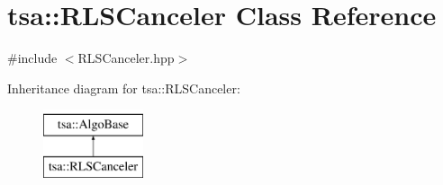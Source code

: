 \hypertarget{classtsa_1_1_r_l_s_canceler}{}\section{tsa\+:\+:R\+L\+S\+Canceler Class Reference}
\label{classtsa_1_1_r_l_s_canceler}


{\ttfamily \#include $<$R\+L\+S\+Canceler.\+hpp$>$}

Inheritance diagram for tsa\+:\+:R\+L\+S\+Canceler\+:\begin{figure}[H]
\begin{center}
\leavevmode
\includegraphics[height=2.000000cm]{classtsa_1_1_r_l_s_canceler}
\end{center}
\end{figure}
